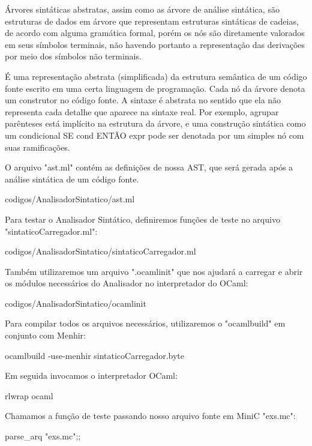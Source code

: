 \documentclass[12pt,a4paper,twoside]{report}
\begin{document}
Árvores sintáticas abstratas, assim como as árvore de análise sintática, são estruturas de dados em árvore que representam estruturas sintáticas de cadeias, de acordo com alguma gramática formal, porém os nós são diretamente valorados em seus símbolos terminais, não havendo portanto a representação das derivações por meio dos símbolos não terminais.

É uma representação abstrata (simplificada) da estrutura semântica de um código fonte escrito em uma certa linguagem de programação. Cada nó da árvore denota um construtor no código fonte. A sintaxe é abstrata no sentido que ela não representa cada detalhe que aparece na sintaxe real. Por exemplo, agrupar parênteses está implícito na estrutura da árvore, e uma construção sintática como um condicional SE cond ENTÃO expr pode ser denotada por um simples nó com suas ramificações.

O arquivo "ast.ml" contém as definições de nossa AST, que será gerada após a análise sintática de um código fonte.

 {codigos/AnalisadorSintatico/ast.ml}

Para testar o Analisador Sintático, definiremos funções de teste no arquivo "sintaticoCarregador.ml":

 {codigos/AnalisadorSintatico/sintaticoCarregador.ml}

Também utilizaremos um arquivo ".ocamlinit" que nos ajudará a carregar e abrir os módulos necessários do Analisador no interpretador do OCaml:

 {codigos/AnalisadorSintatico/ocamlinit}

Para compilar todos os arquivos necessários, utilizaremos o "ocamlbuild" em conjunto com Menhir:

\begin{terminal}
ocamlbuild -use-menhir sintaticoCarregador.byte
\end{terminal}

Em seguida invocamos o interpretador OCaml:

\begin{terminal}
rlwrap ocaml
\end{terminal}

Chamamos a função de teste passando nosso arquivo fonte em MiniC "exs.mc":

\begin{terminal}
parse_arq "exs.mc";;
\end{terminal}
\end{document}

